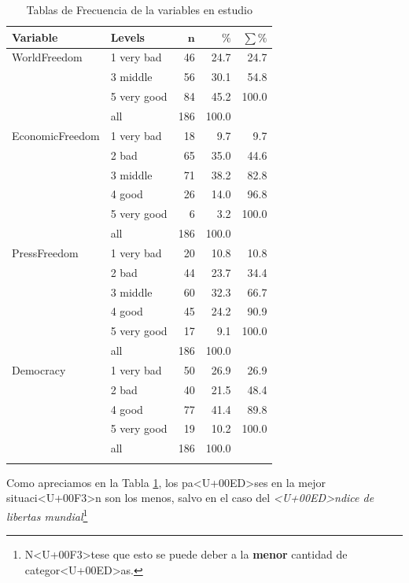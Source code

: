 \documentclass{article}
\begin{document}
\begingroup\normalsize
\begin{longtable}{llrrr}
\caption{Tablas de Frecuencia de la variables en estudio} \\ 
 \textbf{Variable} & \textbf{Levels} & $\mathbf{n}$ & $\mathbf{\%}$ & $\mathbf{\sum \%}$ \\ 
  \hline \hline
WorldFreedom & 1 very bad & 46 & 24.7 & 24.7 \\ 
   & 3 middle & 56 & 30.1 & 54.8 \\ 
   & 5 very good & 84 & 45.2 & 100.0 \\ 
   \hline
 & all & 186 & 100.0 &  \\ 
   \hline
\hline
EconomicFreedom & 1 very bad & 18 & 9.7 & 9.7 \\ 
   & 2 bad & 65 & 35.0 & 44.6 \\ 
   & 3 middle & 71 & 38.2 & 82.8 \\ 
   & 4 good & 26 & 14.0 & 96.8 \\ 
   & 5 very good & 6 & 3.2 & 100.0 \\ 
   \hline
 & all & 186 & 100.0 &  \\ 
   \hline
\hline
PressFreedom & 1 very bad & 20 & 10.8 & 10.8 \\ 
   & 2 bad & 44 & 23.7 & 34.4 \\ 
   & 3 middle & 60 & 32.3 & 66.7 \\ 
   & 4 good & 45 & 24.2 & 90.9 \\ 
   & 5 very good & 17 & 9.1 & 100.0 \\ 
   \hline
 & all & 186 & 100.0 &  \\ 
   \hline
\hline
Democracy & 1 very bad & 50 & 26.9 & 26.9 \\ 
   & 2 bad & 40 & 21.5 & 48.4 \\ 
   & 4 good & 77 & 41.4 & 89.8 \\ 
   & 5 very good & 19 & 10.2 & 100.0 \\ 
   \hline
 & all & 186 & 100.0 &  \\ 
   \hline
\hline
\hline
\label{Tfrecuencias}
\end{longtable}
\endgroup

Como apreciamos en la Tabla \ref{Tfrecuencias}, los pa<U+00ED>ses en la mejor situaci<U+00F3>n son los menos, salvo en el caso del \emph{<U+00ED>ndice de libertas mundial}\footnote{N<U+00F3>tese que esto se puede deber a la {\bf menor} cantidad de categor<U+00ED>as.}
\end{document}
